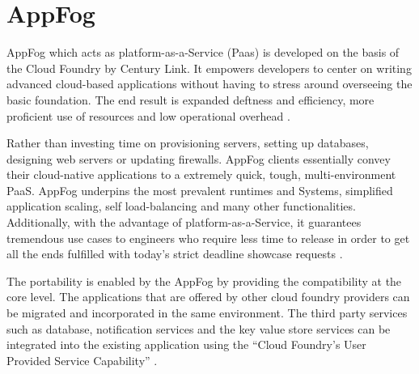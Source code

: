 \section{AppFog}
AppFog which acts as platform-as-a-Service (Paas) is developed on the
basis of the Cloud Foundry by Century Link. It empowers developers to center
on writing advanced cloud-based applications without having to stress
around overseeing the basic foundation. The end result is expanded
deftness and efficiency, more proficient use of resources and low
operational overhead \cite{hid-sp18-412-century_link_appfog}.

Rather than investing time on  provisioning servers, setting up databases,
designing web servers or updating firewalls. AppFog clients essentially
convey their cloud-native applications to a extremely quick, tough,
multi-environment PaaS. AppFog underpins the most prevalent runtimes and
Systems, simplified application scaling, self load-balancing and 
many other functionalities. Additionally, with the advantage of
platform-as-a-Service, it guarantees tremendous
use cases to engineers who require less time to release
in order to get all the ends fulfilled with today’s strict
deadline showcase requests \cite{hid-sp18-412-century_link_appfog}.

The portability is enabled by the AppFog by providing the compatibility at 
the core level.
The applications that are offered by other cloud foundry providers can 
be migrated and incorporated in the same environment. The third party services
such as database, notification services and the key value store services can 
be integrated into the existing application using the 
“Cloud Foundry’s User Provided Service Capability” 
\cite{hid-sp18-412-century_link_appfog}.
